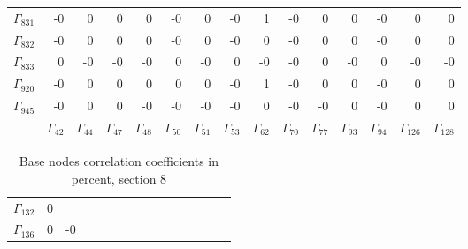 {\begin{table}
\begin{center}
\begin{minipage}{\linewidth}
\begin{center}
\begin{envsmall}
\begin{center}
\renewcommand*{\arraystretch}{1.1}%
\begin{tabular}{rrrrrrrrrrrrrrr}
\hline
\( \Gamma_{831} \) &   -0 &    0 &    0 &    0 &   -0 &    0 &   -0 &    1 &   -0 &    0 &    0 &   -0 &    0 &    0 \\
\( \Gamma_{832} \) &   -0 &    0 &    0 &    0 &   -0 &    0 &   -0 &    0 &   -0 &    0 &    0 &   -0 &    0 &    0 \\
\( \Gamma_{833} \) &    0 &   -0 &   -0 &   -0 &    0 &   -0 &    0 &   -0 &   -0 &    0 &   -0 &    0 &   -0 &   -0 \\
\( \Gamma_{920} \) &   -0 &    0 &    0 &    0 &    0 &    0 &   -0 &    1 &   -0 &    0 &    0 &   -0 &    0 &    0 \\
\( \Gamma_{945} \) &   -0 &    0 &    0 &   -0 &   -0 &   -0 &   -0 &    0 &   -0 &   -0 &    0 &   -0 &    0 &    0 \\
 & \( \Gamma_{42} \) & \( \Gamma_{44} \) & \( \Gamma_{47} \) & \( \Gamma_{48} \) & \( \Gamma_{50} \) & \( \Gamma_{51} \) & \( \Gamma_{53} \) & \( \Gamma_{62} \) & \( \Gamma_{70} \) & \( \Gamma_{77} \) & \( \Gamma_{93} \) & \( \Gamma_{94} \) & \( \Gamma_{126} \) & \( \Gamma_{128} \)
\\\hline
\end{tabular}
\end{center}
\end{envsmall}
\ifhevea\else
\end{center}
\end{minipage}
\fi
\end{center}
\ifhevea\end{table}\fi
\ifhevea\begin{table}\fi%
\begin{center}
\ifhevea
\caption{Base nodes correlation coefficients in percent, section 8\label{tab:tau:br-fit-corr8}}%
\else
\begin{minipage}{\linewidth}
\begin{center}
\label{tab:tau:br-fit-corr8}%
\fi
\begin{envsmall}
\begin{center}
\renewcommand*{\arraystretch}{1.1}%
\begin{tabular}{rrrrrrrrrrrrrrr}
\hline
\( \Gamma_{132} \) &    0 &  &  &  &  &  &  &  &  &  &  &  &  &  \\
\( \Gamma_{136} \) &    0 &   -0 &  &  &  &  &  &  &  &  &  &  &  &  \\

\end{tabular}
\end{center}
\end{envsmall}
\end{center}
\end{minipage}
\end{center}
\end{table}}

